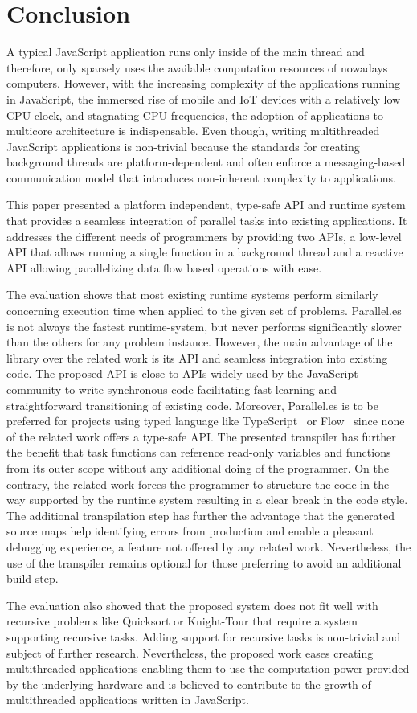 \section{Conclusion}\label{sec:conclusion}
A typical JavaScript application runs only inside of the main thread and therefore, only sparsely uses the available computation resources of nowadays computers. However, with the increasing complexity of the applications running in JavaScript, the immersed rise of mobile and IoT devices with a relatively low CPU clock, and stagnating CPU frequencies, the adoption of applications to multicore architecture is indispensable. Even though, writing multithreaded JavaScript applications is non-trivial because the standards for creating background threads are platform-dependent and often enforce a messaging-based communication model that introduces non-inherent complexity to applications.

This paper presented a platform independent, type-safe API and runtime system that provides a seamless integration of parallel tasks into existing applications. It addresses the different needs of programmers by providing two APIs, a low-level API that allows running a single function in a background thread and a reactive API allowing parallelizing data flow based operations with ease. 

The evaluation shows that most existing runtime systems perform similarly concerning execution time when applied to the given set of problems. Parallel.es is not always the fastest runtime-system, but never performs significantly slower than the others for any problem instance. However, the main advantage of the library over the related work is its API and seamless integration into existing code. The proposed API is close to APIs widely used by the JavaScript community to write synchronous code facilitating fast learning and straightforward transitioning of existing code. Moreover, Parallel.es is to be preferred for projects using typed language like TypeScript~\cite{typescript} or Flow~\cite{flow} since none of the related work offers a type-safe API. The presented transpiler has further the benefit that task functions can reference read-only variables and functions from its outer scope without any additional doing of the programmer. On the contrary, the related work forces the programmer to structure the code in the way supported by the runtime system resulting in a clear break in the code style. The additional transpilation step has further the advantage that the generated source maps help identifying errors from production and enable a pleasant debugging experience, a feature not offered by any related work. Nevertheless, the use of the transpiler remains optional for those preferring to avoid an additional build step.

The evaluation also showed that the proposed system does not fit well with recursive problems like Quicksort or Knight-Tour that require a system supporting recursive tasks. Adding support for recursive tasks is non-trivial and subject of further research. Nevertheless, the proposed work eases creating multithreaded applications enabling them to use the computation power provided by the underlying hardware and is believed to contribute to the growth of multithreaded applications written in JavaScript. 